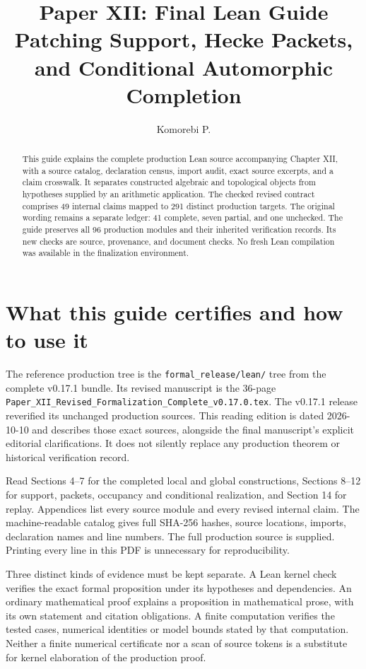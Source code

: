 \documentclass[11pt]{article}
\title{Paper XII: Final Lean Guide\\\large Patching Support, Hecke Packets, and Conditional Automorphic Completion}
\author{Komorebi P.}\date{}
\newcommand{\code}[1]{\nolinkurl{#1}}
\begin{document}
\KomorebiCover


\relax
\begin{abstract}
This guide explains the complete production Lean source accompanying Chapter XII, with a source catalog, declaration census, import audit, exact source excerpts, and a claim crosswalk. It separates constructed algebraic and topological objects from hypotheses supplied by an arithmetic application. The checked revised contract comprises 49 internal claims mapped to 291 distinct production targets. The original wording remains a separate ledger: 41 complete, seven partial, and one unchecked. The guide preserves all 96 production modules and their inherited verification records. Its new checks are source, provenance, and document checks. No fresh Lean compilation was available in the finalization environment.
\end{abstract}
{\setlength{\parskip}{0pt}\linespread{1.0}\selectfont\tableofcontents}
\newpage

\section{What this guide certifies and how to use it}
The reference production tree is the \code{formal_release/lean/} tree from the complete v0.17.1 bundle. Its revised manuscript is the 36-page \code{Paper_XII_Revised_Formalization_Complete_v0.17.0.tex}. The v0.17.1 release reverified its unchanged production sources. This reading edition is dated 2026-10-10 and describes those exact sources, alongside the final manuscript's explicit editorial clarifications. It does not silently replace any production theorem or historical verification record.

Read Sections 4--7 for the completed local and global constructions, Sections 8--12 for support, packets, occupancy and conditional realization, and Section 14 for replay. Appendices list every source module and every revised internal claim. The machine-readable catalog gives full SHA-256 hashes, source locations, imports, declaration names and line numbers. The full production source is supplied. Printing every line in this PDF is unnecessary for reproducibility.

Three distinct kinds of evidence must be kept separate. A Lean kernel check verifies the exact formal proposition under its hypotheses and dependencies. An ordinary mathematical proof explains a proposition in mathematical prose, with its own statement and citation obligations. A finite computation verifies the tested cases, numerical identities or model bounds stated by that computation. Neither a finite numerical certificate nor a scan of source tokens is a substitute for kernel elaboration of the production proof.
\end{document}
